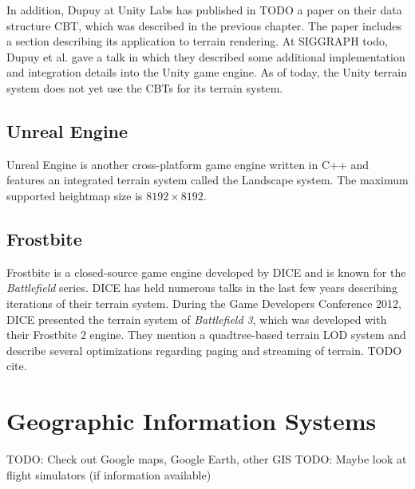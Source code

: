 In addition, Dupuy at Unity Labs has published in TODO 
a paper on their data structure CBT, which was described in the previous chapter. 
The paper includes a section describing its application to terrain rendering.
At SIGGRAPH todo, Dupuy et al. gave a talk in which they described some additional implementation and integration details
into the Unity game engine. As of today, the Unity terrain system does not yet use 
the CBTs for its terrain system.

\subsection{Unreal Engine}
Unreal Engine is another cross-platform game engine written in C++ and features
an integrated terrain system called the Landscape system.
The maximum supported heightmap size is $8192 \times 8192$.


\subsection{Frostbite}
Frostbite is a closed-source game engine developed by DICE and is known for the \textit{Battlefield} series.
DICE has held numerous talks in the last few years describing iterations of their
terrain system.
During the Game Developers Conference 2012, DICE presented the terrain system of \textit{Battlefield 3}, which was developed with their Frostbite 2 engine.
They mention a quadtree-based terrain LOD system and describe several optimizations regarding paging and streaming of terrain.
TODO cite.

\section{Geographic Information Systems}
TODO: Check out Google maps, Google Earth, other GIS
TODO: Maybe look at flight simulators (if information available)
